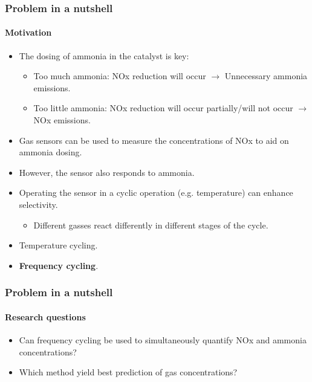 \documentclass{beamer}
\begin{document}
\begin{frame}
	\frametitle{Problem in a nutshell}
	\framesubtitle{Motivation}
	
	\begin{itemize}
		\item The dosing of ammonia in the catalyst is key:
		\pause
		\begin{itemize}
			\item Too much ammonia: NOx reduction will occur $\rightarrow$ Unnecessary ammonia emissions.
			\pause
			\item Too little ammonia: NOx reduction will occur partially/will not occur $\rightarrow$ NOx emissions.
			\pause
		\end{itemize}
		\item Gas sensors can be used to measure the concentrations of NOx to aid on ammonia dosing.
		\pause
		\item However, the sensor also responds to ammonia.
		\pause
		\item Operating the sensor in a cyclic operation (e.g. temperature) can enhance selectivity.
		\pause
		\begin{itemize}
			\item Different gasses react differently in different stages of the cycle.
			\pause
		\end{itemize}
		\item Temperature cycling.
		\pause
		\item \textbf{Frequency cycling}.
	\end{itemize}
	
\end{frame}


\begin{frame}
	\frametitle{Problem in a nutshell}
	\framesubtitle{Research questions}
	\pause
	
	\begin{itemize}
		\item Can frequency cycling be used to simultaneously quantify NOx and ammonia concentrations?
		\pause
		\item Which method yield best prediction of gas concentrations?
	\end{itemize}
	
\end{frame}
\end{document}
